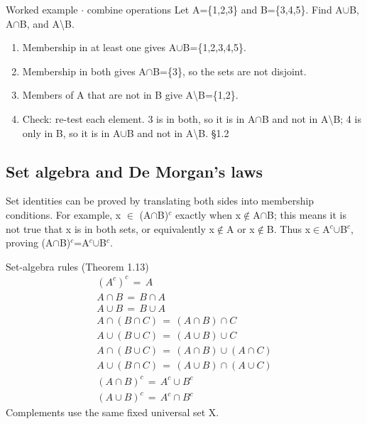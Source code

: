 \documentclass[11pt]{article}
\begin{document}
\begin{keepsection}
\begin{keepsection}
\begin{workedbox}{Worked example \ensuremath{\cdot} combine operations}
Let A=\{1,2,3\} and B=\{3,4,5\}. Find A\ensuremath{\cup}B, A\ensuremath{\cap}B, and A\textbackslash{}B.

\begin{enumerate}
\item Membership in at least one gives A\ensuremath{\cup}B=\{1,2,3,4,5\}.
\item Membership in both gives A\ensuremath{\cap}B=\{3\}, so the sets are not disjoint.
\item Members of A that are not in B give A\textbackslash{}B=\{1,2\}.
\item Check: re-test each element. 3 is in both, so it is in A\ensuremath{\cap}B and not in A\textbackslash{}B; 4 is only in B, so it is in A\ensuremath{\cup}B and not in A\textbackslash{}B. \hfill{\small\color{FAUblue}§1.2}
\end{enumerate}
\end{workedbox}
\end{keepsection}

\begin{keepsection}
\subsection{Set algebra and De Morgan’s laws}

Set identities can be proved by translating both sides into membership conditions. For example, x \ensuremath{\in} (A\ensuremath{\cap}B)\ensuremath{^{c}} exactly when x\ensuremath{\notin}A\ensuremath{\cap}B; this means it is not true that x is in both sets, or equivalently x\ensuremath{\notin}A or x\ensuremath{\notin}B. Thus x\ensuremath{\in}A\ensuremath{^{c}}\ensuremath{\cup}B\ensuremath{^{c}}, proving (A\ensuremath{\cap}B)\ensuremath{^{c}}=A\ensuremath{^{c}}\ensuremath{\cup}B\ensuremath{^{c}}.

\begin{equationcard}{Set-algebra rules (Theorem 1.13)}
\[ \begin{gathered} ({A}^{c})^{c}\, =\, {A} \\ {A}\cap {B}\, =\, {B}\cap {A} \\ {A}\cup {B}\, =\, {B}\cup {A} \\ {A}\cap ({B}\cap {C})\, =\, ({A}\cap {B})\cap {C} \\ {A}\cup ({B}\cup {C})\, =\, ({A}\cup {B})\cup {C} \\ {A}\cap ({B}\cup {C})\, =\, ({A}\cap {B})\cup ({A}\cap {C}) \\ {A}\cup ({B}\cap {C})\, =\, ({A}\cup {B})\cap ({A}\cup {C}) \\ ({A}\cap {B})^{c}\, =\, {A}^{c}\cup {B}^{c} \\ ({A}\cup {B})^{c}\, =\, {A}^{c}\cap {B}^{c} \end{gathered} \]
{\small Complements use the same fixed universal set X.}
\end{equationcard}


\end{keepsection}
\end{keepsection}
\end{document}
